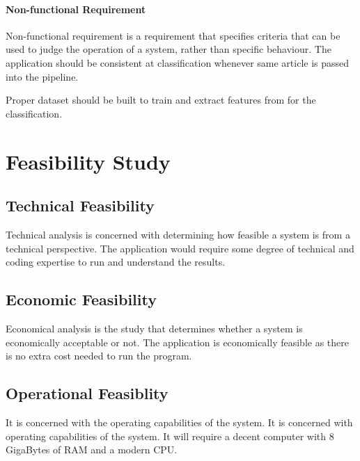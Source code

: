 \documentclass[12pt]{report}
\begin{document}
                
                \paragraph{Non-functional Requirement}
                Non-functional requirement is a requirement that specifies criteria that can be used to judge the
                operation of a system, rather than specific behaviour.
                    The application should be consistent at classification whenever same article is passed into  the pipeline. 
                    
                    Proper dataset should be built to train and extract features from for the classification. 
            
        \section{Feasibility Study}
            
            \subsection{Technical Feasibility}
            
            Technical analysis is concerned with determining how feasible a system is from a technical
perspective.
                The application would require some degree of technical and coding expertise to run and understand the results.

            \subsection{Economic Feasibility}
            Economical analysis is the study that determines whether a system is economically acceptable or
not.
                The application is economically feasible as there is no extra cost needed to run the program.
            \subsection{Operational Feasiblity}
            It is concerned with the operating capabilities of the system.
                It is concerned with operating capabilities of the system. It will require a decent computer with 8 GigaBytes of RAM and a modern CPU. 

             
\end{document}
